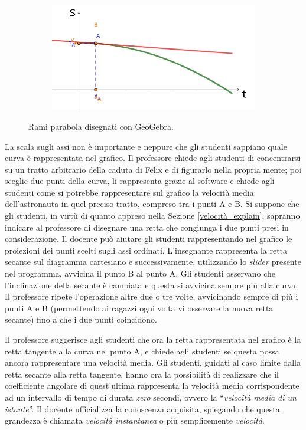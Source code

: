 \documentclass{report} \usepackage[T1]{fontenc} \usepackage[italian]{babel}
\begin{document}
\begin{figure}[H]
\begin{subfigure}[b]{0.49\textwidth}
  \end{subfigure}
  \begin{subfigure}[b]{0.49\textwidth}
  \includegraphics[width=\textwidth]{tg4}
  \end{subfigure}
  \caption{
           Rami parabola  disegnati con GeoGebra.
          }
  \label{fig:geogebra}
\end{figure}

La scala sugli assi non è importante e neppure che gli studenti sappiano quale
curva è rappresentata nel grafico.
Il professore chiede agli studenti di concentrarsi su un tratto arbitrario della
caduta di Felix e di figurarlo nella propria mente; poi sceglie due punti
della curva, li rappresenta grazie al software e chiede agli studenti
come si potrebbe rappresentare sul grafico la velocità media dell'astronauta
in quel preciso tratto, compreso tra i punti A e B.
Si suppone che gli studenti, in virtù di quanto appreso
nella Sezione \ref{velocità_explain}, sapranno indicare al professore di
disegnare una retta che congiunga i due punti presi in considerazione.
Il docente può aiutare gli studenti rappresentando nel grafico le proiezioni
dei punti scelti sugli assi ordinati.
L'insegnante rappresenta la retta secante sul diagramma cartesiano e
successivamente, utilizzando lo \emph{slider} presente nel programma,
avvicina il punto B al punto A. Gli studenti osservano che l'inclinazione
della secante è cambiata e questa si avvicina sempre più alla curva.
Il professore ripete l'operazione altre due o
tre volte, avvicinando sempre di più i punti A e B (permettendo ai ragazzi
ogni volta vi osservare la nuova retta secante) fino a che i due punti
coincidono.

Il professore suggerisce agli studenti che ora la retta rappresentata nel grafico
è la retta tangente alla curva nel punto A, e chiede agli studenti se questa possa
ancora rappresentare una velocità media. Gli studenti, guidati al caso limite dalla retta
secante alla retta tangente, hanno ora la possibilità di realizzare che il coefficiente
angolare di quest'ultima rappresenta la velocità media corrispondente ad un intervallo
di tempo di durata \emph{zero} secondi, ovvero la ``\emph{velocità media di un istante}''.
Il docente ufficializza la conoscenza acquisita, spiegando che questa grandezza è
chiamata \emph{velocità instantanea} o più semplicemente \emph{velocità}.
\end{document}

